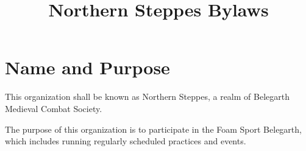 \documentclass[12pt]{article}
\title{Northern Steppes Bylaws}
\begin{document}

\maketitle



\section{Name and Purpose}
\begin{level}
    \item This organization shall be known as Northern Steppes, a realm of Belegarth Medieval Combat Society.
    \item The purpose of this organization is to participate in the Foam Sport Belegarth, which includes running regularly scheduled practices and events.
\end{level}

\end{document}
